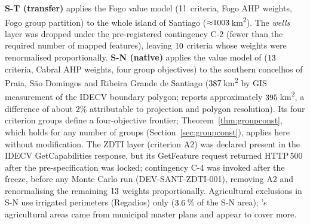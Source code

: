 \textbf{S-T (transfer)} applies the Fogo value model
($11$ criteria, Fogo AHP weights, Fogo group partition)
to the whole island of Santiago
(${\approx}1003$\,km\textsuperscript{2}).
The \textit{wells} layer was dropped under the pre-registered contingency
C-2 (fewer than the required number of mapped features), leaving
$10$ criteria whose weights were renormalised proportionally.
\textbf{S-N (native)} applies the value model of \citet{Cabral2012}
($13$ criteria, Cabral AHP weights, four group objectives)
to the southern concelhos of Praia, S\~ao Domingos and Ribeira Grande
de Santiago ($387$\,km\textsuperscript{2} by GIS measurement of the
IDECV boundary polygon; \citet{Cabral2012} reports approximately
$395$\,km\textsuperscript{2}, a difference of about 2\% attributable
to projection and polygon resolution).
Its four criterion groups define a four-objective frontier;
Theorem~\ref{thm:groupconst}, which holds for any number of groups
(Section~\ref{sec:groupconst}), applies here without modification.
The ZDTI layer (criterion A2) was declared present in the IDECV
GetCapabilities response, but its GetFeature request returned HTTP\,500
after the pre-specification was locked; contingency C-4 was invoked
after the freeze, before any Monte Carlo run (DEV-SANT-ZDTI-001),
removing A2 and renormalising the remaining
$13$ weights proportionally.
Agricultural exclusions in S-N use irrigated perimeters (Regadios) only
($3.6$\,\% of the S-N area);
\citet{Cabral2012}'s agricultural areas came from municipal master
plans and appear to cover more.

